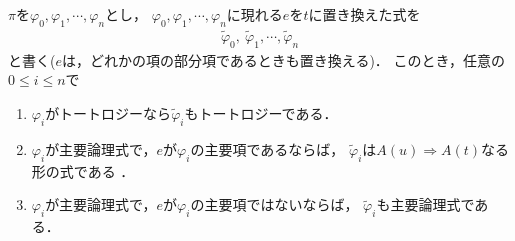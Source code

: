 	$\pi$を$\varphi_{0},\varphi_{1},\cdots,\varphi_{n}$とし，
	$\varphi_{0},\varphi_{1},\cdots,\varphi_{n}$に現れる$e$を$t$に置き換えた式を
	\begin{align}
		\tilde{\varphi}_{0},\ \tilde{\varphi}_{1},\cdots, \tilde{\varphi}_{n}
	\end{align}
	と書く($e$は，どれかの項の部分項であるときも置き換える)．
	このとき，任意の$0 \leq i \leq n$で
	\begin{enumerate}
		\item $\varphi_{i}$がトートロジーなら$\tilde{\varphi}_{i}$もトートロジーである．
		\item $\varphi_{i}$が主要論理式で，$e$が$\varphi_{i}$の主要項であるならば，
			$\tilde{\varphi}_{i}$は$A(u) \Longrightarrow A(t)$なる形の式である
			\footnotemark．
		\item $\varphi_{i}$が主要論理式で，$e$が$\varphi_{i}$の主要項ではないならば，
			$\tilde{\varphi}_{i}$も主要論理式である．
	\end{enumerate}
	
	

